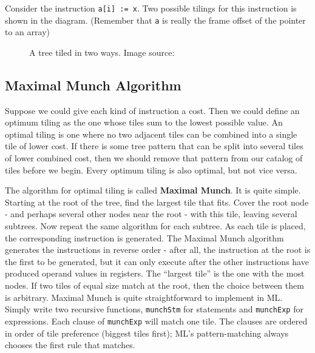 Consider the instruction
\texttt{a[i] := x}.
Two possible tilings for this instruction is shown in the diagram.
(Remember that
\texttt{a} is
really the frame offset of the pointer to an array)

\begin{figure}
	\centering
	\caption{A tree tiled in two ways. Image source: \cite{tigerbook}}
\end{figure}

\hypertarget{maximal-munch-algorithm}{%
	\subsection{Maximal Munch Algorithm}\label{maximal-munch-algorithm}}

Suppose we could give each kind of instruction a cost. Then we could
define an optimum tiling as the one whose tiles sum to the lowest
possible value. An optimal tiling is one where no two adjacent tiles can
be combined into a single tile of lower cost. If there is some tree
pattern that can be split into several tiles of lower combined cost,
then we should remove that pattern from our catalog of tiles before we
begin. Every optimum tiling is also optimal, but not vice versa.

The algorithm for optimal tiling is called \textbf{Maximal Munch}. It is
quite simple. Starting at the root of the tree, find the largest tile
that fits. Cover the root node - and perhaps several other nodes near
the root - with this tile, leaving several subtrees. Now repeat the same
algorithm for each subtree. As each tile is placed, the corresponding
instruction is generated. The Maximal Munch algorithm generates the
instructions in reverse order - after all, the instruction at the root
is the first to be generated, but it can only execute after the other
instructions have produced operand values in registers. The ``largest
tile'' is the one with the most nodes. If two tiles of equal size match
at the root, then the choice between them is arbitrary. Maximal Munch is
quite straightforward to implement in ML. Simply write two recursive
functions,
\texttt{munchStm}
for statements and
\texttt{munchExp}
for expressions. Each clause of
\texttt{munchExp}
will match one tile. The clauses are ordered in order of tile preference
(biggest tiles first); ML's pattern-matching always chooses the first
rule that matches.

